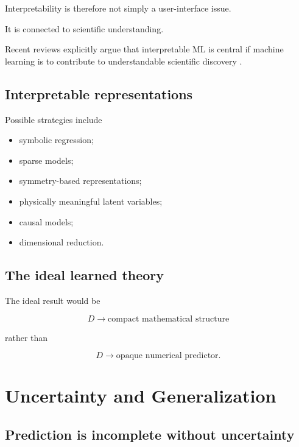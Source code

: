 \documentclass[11pt,a4paper,oneside]{book}
\begin{document}
Interpretability is therefore not simply a user-interface issue.

It is connected to scientific understanding.

Recent reviews explicitly argue that interpretable ML is central if machine
learning is to contribute to understandable scientific discovery
\citep{Wetzel2025}.

\section{Interpretable representations}

Possible strategies include

\begin{itemize}
\item symbolic regression;
\item sparse models;
\item symmetry-based representations;
\item physically meaningful latent variables;
\item causal models;
\item dimensional reduction.
\end{itemize}

\section{The ideal learned theory}

The ideal result would be

\begin{equation}
D
\longrightarrow
\boxed{
\text{compact mathematical structure}
}
\end{equation}

rather than

\begin{equation}
D
\longrightarrow
\boxed{
\text{opaque numerical predictor}.
}
\end{equation}

\chapter{Uncertainty and Generalization}

\section{Prediction is incomplete without uncertainty}
\end{document}
